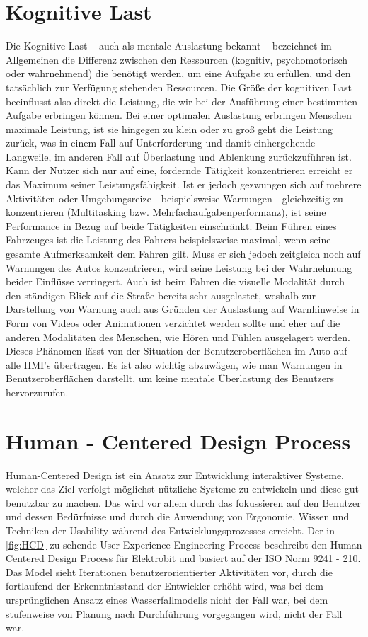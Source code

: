 \section{Kognitive Last}
Die Kognitive Last – auch als mentale Auslastung bekannt – bezeichnet im Allgemeinen die Differenz zwischen den Ressourcen (kognitiv, psychomotorisch oder wahrnehmend) die benötigt werden, um eine Aufgabe zu erfüllen, und den tatsächlich zur Verfügung stehenden Ressourcen. Die Größe der kognitiven Last beeinflusst also direkt die Leistung, die wir bei der Ausführung einer bestimmten Aufgabe erbringen können. Bei einer optimalen Auslastung erbringen Menschen maximale Leistung, ist sie hingegen zu klein oder zu groß geht die Leistung zurück, was in einem Fall auf Unterforderung und damit einhergehende Langweile, im anderen Fall auf Überlastung und Ablenkung zurückzuführen ist\cite{Miucic.2019}. 
Kann der Nutzer sich nur auf eine, fordernde Tätigkeit konzentrieren erreicht er das Maximum seiner Leistungsfähigkeit.
Ist er jedoch gezwungen sich auf mehrere Aktivitäten oder Umgebungsreize - beispielsweise Warnungen - gleichzeitig zu konzentrieren (Multitasking bzw. Mehrfachaufgabenperformanz), ist seine Performance in Bezug auf beide Tätigkeiten einschränkt.
Beim Führen eines Fahrzeuges ist die Leistung des Fahrers beispielsweise maximal, wenn seine gesamte Aufmerksamkeit dem Fahren gilt.
Muss er sich jedoch zeitgleich noch auf Warnungen des Autos konzentrieren, wird seine Leistung bei der Wahrnehmung beider Einflüsse verringert.
Auch ist beim Fahren die visuelle Modalität durch den ständigen Blick auf die Straße bereits sehr ausgelastet, weshalb zur Darstellung von Warnung auch aus Gründen der Auslastung auf Warnhinweise in Form von Videos oder Animationen verzichtet werden sollte und eher auf die anderen Modalitäten des Menschen, wie Hören und Fühlen ausgelagert werden.
Dieses Phänomen lässt von der Situation der Benutzeroberflächen im Auto auf alle HMI's übertragen.
Es ist also wichtig abzuwägen, wie man Warnungen in Benutzeroberflächen darstellt, um keine mentale Überlastung des Benutzers hervorzurufen. 

\section{Human - Centered  Design Process}
Human-Centered Design ist ein Ansatz zur Entwicklung interaktiver Systeme, welcher das Ziel verfolgt möglichst nützliche Systeme zu entwickeln und diese gut benutzbar zu machen.
Das wird vor allem durch das fokussieren auf den Benutzer und dessen Bedürfnisse und durch die Anwendung von Ergonomie, Wissen und Techniken der Usability während des Entwicklungsprozesses erreicht\cite{.}.
Der in \cref{fig:HCD} zu sehende User Experience Engineering Process beschreibt den Human Centered Design Process für Elektrobit und basiert auf der ISO Norm 9241 - 210.
Das Model sieht Iterationen benutzerorientierter Aktivitäten vor, durch die fortlaufend der Erkenntnisstand der Entwickler erhöht wird, was bei dem ursprünglichen Ansatz eines Wasserfallmodells nicht der Fall war, bei dem stufenweise von Planung nach Durchführung vorgegangen wird, nicht der Fall war.

